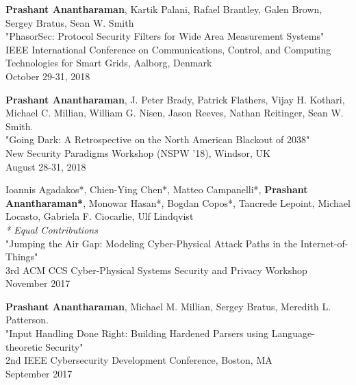 \documentclass[letterpaper,10pt]{article}
\begin{document}
\begin{etaremune}
  \setlength\itemsep{0ex}

\item {\bf Prashant Anantharaman}, Kartik Palani, Rafael Brantley, Galen Brown, Sergey Bratus, Sean W. Smith\\
"PhasorSec: Protocol Security Filters for Wide Area Measurement Systems"\\
IEEE International Conference on Communications, Control, and Computing Technologies for Smart Grids, Aalborg, Denmark\\
October 29-31, 2018

	\item {\bf Prashant Anantharaman}, J. Peter Brady, Patrick Flathers, Vijay H. Kothari, Michael C. Millian, William G. Nisen, Jason Reeves, Nathan Reitinger, Sean W. Smith.\\
	"Going Dark: A Retrospective on the North American Blackout of 2038"\\
	New Security Paradigms Workshop (NSPW '18), Windsor, UK\\
	August 28-31, 2018

  \item Ioannis Agadakos*, Chien-Ying Chen*, Matteo Campanelli*, {\bf Prashant Anantharaman*}, Monowar Hasan*, Bogdan Copos*, Tancrede Lepoint, Michael Locasto, Gabriela F. Ciocarlie, Ulf Lindqvist \\
  		\textit{* Equal Contributions}\\
		"Jumping the Air Gap: Modeling Cyber-Physical Attack Paths in the Internet-of-Things" \\
		 3rd ACM CCS Cyber-Physical Systems Security and Privacy Workshop \\
		 November 2017
  \item {\bf Prashant Anantharaman}, Michael M. Millian, Sergey Bratus, Meredith L. Patterson.\\
  		"Input Handling Done Right: Building Hardened Parsers using Language-theoretic Security"\\
		 2nd IEEE Cybersecurity Development Conference, Boston, MA\\
		 September 2017
  

\end{etaremune}
\end{document}
